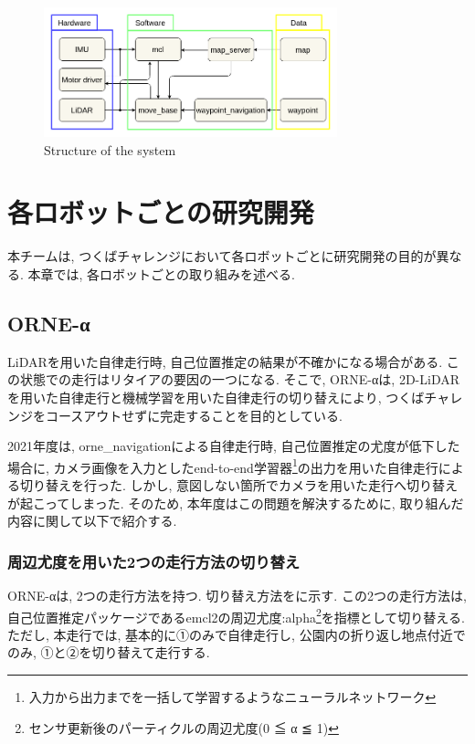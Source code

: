 \documentclass[uplatex, twocolumn, 9pt]{jsproceedings}
\begin{document}
\begin{figure}[h]
  \centering
  \includegraphics[width=85mm]{fig/software.pdf}
  \caption{Structure of the system}
  \label{fig:soft-fig}%
\end{figure}

\newpage
\section{各ロボットごとの研究開発}
本チームは, つくばチャレンジにおいて各ロボットごとに研究開発の目的が異なる. 本章では, 各ロボットごとの取り組みを述べる.

\subsection{ORNE-α}
LiDARを用いた自律走行時, 自己位置推定の結果が不確かになる場合がある. この状態での走行はリタイアの要因の一つになる. そこで, ORNE-αは, 2D-LiDARを用いた自律走行と機械学習を用いた自律走行の切り替えにより, つくばチャレンジをコースアウトせずに完走することを目的としている. \par 2021年度は, orne\_navigationによる自律走行時, 自己位置推定の尤度が低下した場合に, カメラ画像を入力としたend-to-end学習器\footnote[1]{入力から出力までを一括して学習するようなニューラルネットワーク}\cite{end-to-end}の出力を用いた自律走行による切り替えを行った. しかし, 意図しない箇所でカメラを用いた走行へ切り替えが起こってしまった. そのため, 本年度はこの問題を解決するために, 取り組んだ内容に関して以下で紹介する. 

\subsubsection{周辺尤度を用いた2つの走行方法の切り替え}
ORNE-αは, 2つの走行方法を持つ. 切り替え方法をに示す. この2つの走行方法は, 自己位置推定パッケージであるemcl2\cite{emcl2-git}の周辺尤度:alpha\footnote[2]{センサ更新後のパーティクルの周辺尤度(0 ≦ α ≦ 1)}を指標として切り替える. ただし, 本走行では, 基本的に①のみで自律走行し, 公園内の折り返し地点付近でのみ, ①と②を切り替えて走行する.
\end{document}

